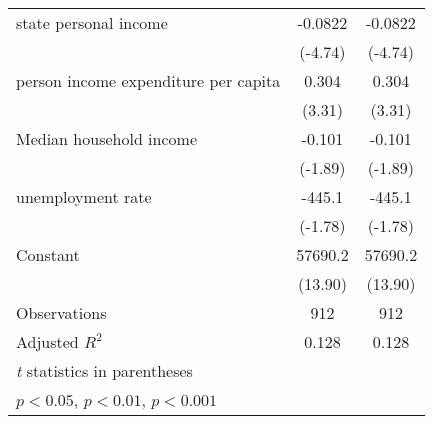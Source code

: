 {\begin{tabular}{l*{2}{c}}
state personal income&     -0.0822\sym{***}&     -0.0822\sym{***}\\
                    &     (-4.74)         &     (-4.74)         \\
[1em]
person income expenditure per capita&       0.304\sym{***}&       0.304\sym{***}\\
                    &      (3.31)         &      (3.31)         \\
[1em]
Median household income&      -0.101         &      -0.101         \\
                    &     (-1.89)         &     (-1.89)         \\
[1em]
unemployment rate   &      -445.1         &      -445.1         \\
                    &     (-1.78)         &     (-1.78)         \\
[1em]
Constant            &     57690.2\sym{***}&     57690.2\sym{***}\\
                    &     (13.90)         &     (13.90)         \\
\hline
Observations        &         912         &         912         \\
Adjusted \(R^{2}\)  &       0.128         &       0.128         \\
\hline\hline
\multicolumn{3}{l}{\footnotesize \textit{t} statistics in parentheses}\\
\multicolumn{3}{l}{\footnotesize \sym{*} \(p<0.05\), \sym{**} \(p<0.01\), \sym{***} \(p<0.001\)}\\
\end{tabular}
}
